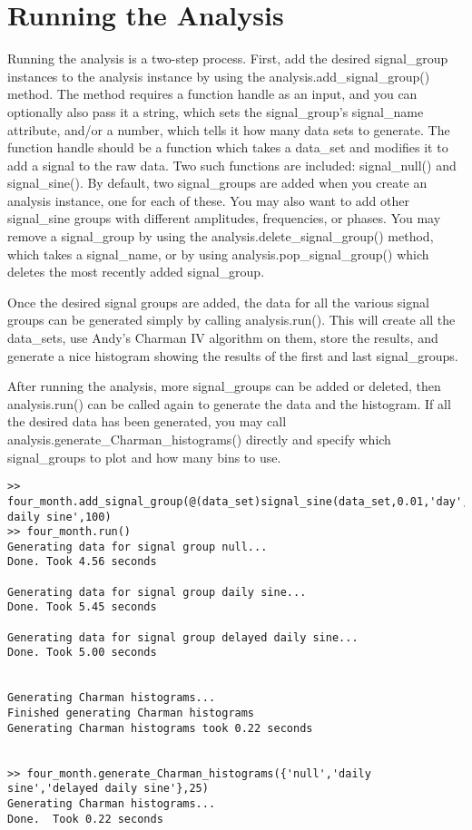 \documentclass[12pt]{report}
\begin{document}
\section{Running the Analysis}
Running the analysis is a two-step process.  First, add the desired signal\_group instances to the analysis instance by using the analysis.add\_signal\_group() method.  The method requires a function handle as an input, and you can optionally also pass it a string, which sets the signal\_group's signal\_name attribute, and/or a number, which tells it how many data sets to generate.  The function handle should be a function which takes a data\_set and modifies it to add a signal to the raw data.  Two such functions are included: signal\_null() and signal\_sine().  By default, two signal\_groups are added when you create an analysis instance, one for each of these.  You may also want to add other signal\_sine groups with different amplitudes, frequencies, or phases.  You may remove a signal\_group by using the analysis.delete\_signal\_group() method, which takes a signal\_name, or by using analysis.pop\_signal\_group() which deletes the most recently added signal\_group.

Once the desired signal groups are added, the data for all the various signal groups can be generated simply by calling analysis.run().  This will create all the data\_sets, use Andy's Charman IV algorithm on them, store the results, and generate a nice histogram showing the results of the first and last signal\_groups.

After running the analysis, more signal\_groups can be added or deleted, then analysis.run() can be called again to generate the data and the histogram.  If all the desired data has been generated, you may call analysis.generate\_Charman\_histograms() directly and specify which signal\_groups to plot and how many bins to use.

\begin{verbatim}
>> four_month.add_signal_group(@(data_set)signal_sine(data_set,0.01,'day',pi/8),'delayed daily sine',100)
>> four_month.run()
Generating data for signal group null...
Done. Took 4.56 seconds

Generating data for signal group daily sine...
Done. Took 5.45 seconds

Generating data for signal group delayed daily sine...
Done. Took 5.00 seconds


Generating Charman histograms...
Finished generating Charman histograms
Generating Charman histograms took 0.22 seconds


>> four_month.generate_Charman_histograms({'null','daily sine','delayed daily sine'},25)
Generating Charman histograms...
Done.  Took 0.22 seconds
\end{verbatim}
\end{document}
